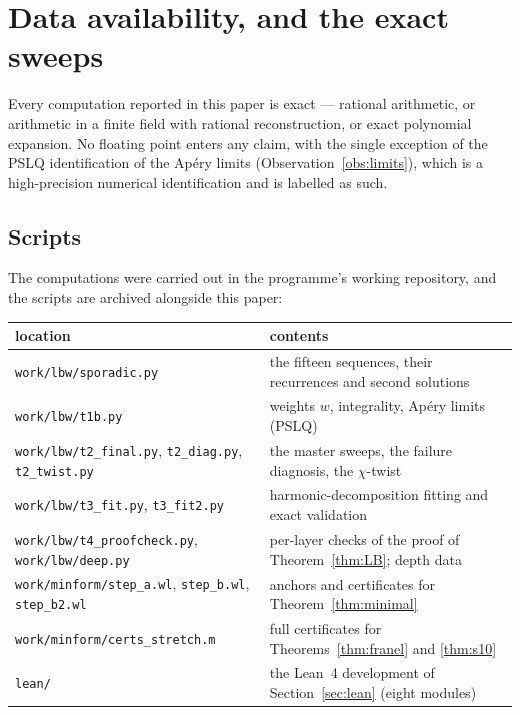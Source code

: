\section{Data availability, and the exact sweeps}
\label{sec:data}

Every computation reported in this paper is exact --- rational arithmetic, or arithmetic
in a finite field with rational reconstruction, or exact polynomial expansion. No floating
point enters any claim, with the single exception of the PSLQ identification of the
Ap\'ery limits (Observation~\ref{obs:limits}), which is a high-precision numerical
identification and is labelled as such.

\subsection{Scripts}

The computations were carried out in the programme's working repository, and the scripts
are archived alongside this paper:

\begin{center}\small
\begin{tabular}{@{}>{\raggedright\arraybackslash}p{5.4cm}>{\raggedright\arraybackslash}p{7.6cm}@{}}
\toprule
location & contents\\
\midrule
\texttt{work/lbw/sporadic.py} & the fifteen sequences, their recurrences and second solutions\\
\texttt{work/lbw/t1b.py} & weights $w$, integrality, Ap\'ery limits (PSLQ)\\
\texttt{work/lbw/t2\_final.py}, \texttt{t2\_diag.py}, \texttt{t2\_twist.py}
   & the master sweeps, the failure diagnosis, the $\chi$-twist\\
\texttt{work/lbw/t3\_fit.py}, \texttt{t3\_fit2.py} & harmonic-decomposition fitting and exact validation\\
\texttt{work/lbw/t4\_proofcheck.py}, \texttt{work/lbw/deep.py} & per-layer checks of the proof of Theorem~\ref{thm:LB}; depth data\\
\texttt{work/minform/step\_a.wl}, \texttt{step\_b.wl}, \texttt{step\_b2.wl}
   & anchors and certificates for Theorem~\ref{thm:minimal}\\
\texttt{work/minform/certs\_stretch.m} & full certificates for Theorems~\ref{thm:franel} and \ref{thm:s10}\\
\texttt{lean/} & the Lean~4 development of Section~\ref{sec:lean} (eight modules)\\
\bottomrule
\end{tabular}
\end{center}

